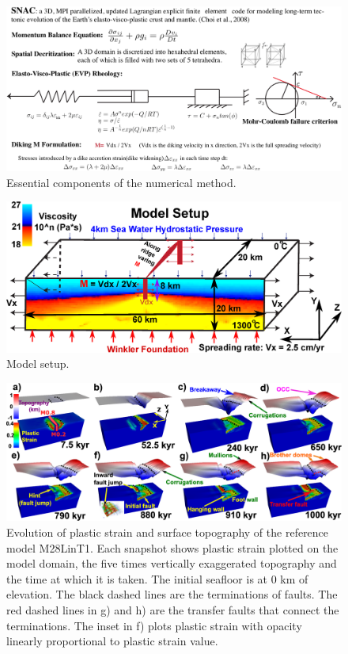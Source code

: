 \documentclass[draft,gc]{agutex}
\begin{document}
\begin{figure}[h]
\noindent\includegraphics[width=1.0\textwidth]{./Figures/fig_Methods7_3.eps}
 \caption{Essential components of the numerical method.}
 \label{fig_Methods7_3}
\end{figure}

\begin{figure}[h]
\noindent\includegraphics[width=1.0\textwidth] {./Figures/fig_Methods_Model_Setup.eps}
 \caption{Model setup.}
 \label{fig_Methods8_1}
\end{figure}

\begin{figure}[h]
\noindent\includegraphics[width=1.0\textwidth]{./Figures/fig_Results_1_reference_model.eps}
  \caption[Reference model M28LinT1.]{Evolution of plastic strain and surface topography of the reference model M28LinT1. Each snapshot shows plastic strain plotted on the model domain, the five times vertically exaggerated topography and the time at which it is taken. The initial seafloor is at 0 km of elevation. The black dashed lines are the terminations of faults. The red dashed lines in g) and h) are the transfer faults that connect the terminations. The inset in f) plots plastic strain with opacity linearly proportional to plastic strain value.}
 \label{fig_Results1_1}
\end{figure}   
\end{document}
